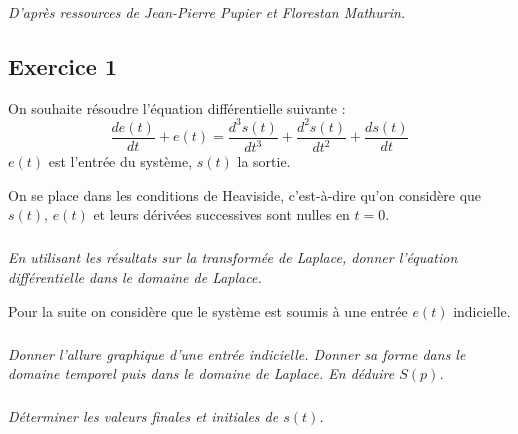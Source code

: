 \documentclass[11pt,oneside]{article}
\begin{document}
\begin{flushright}
\textit{D'après ressources de Jean-Pierre Pupier et Florestan Mathurin.} 
\end{flushright}
\vspace{.5cm}

\subsection*{Exercice 1}
\setcounter{subparagraph}{0}
On souhaite résoudre l'équation différentielle suivante : 
$$
\dfrac{de(t)}{dt}+e(t) = \dfrac{d^3s(t)}{dt^3}+\dfrac{d^2s(t)}{dt^2}+\dfrac{ds(t)}{dt}
$$
$e(t)$ est l'entrée du système, $s(t)$ la sortie.

On se place dans les conditions de Heaviside, c'est-à-dire qu'on considère que $s(t)$, $e(t)$ et leurs dérivées successives sont nulles en $t=0$. 

\subparagraph{}
\textit{En utilisant les résultats sur la transformée de Laplace, donner l'équation différentielle dans le domaine de Laplace.}


Pour la suite on considère que le système est soumis à une entrée $e(t)$ indicielle. 

\subparagraph{}
\textit{Donner l'allure graphique d'une entrée indicielle. Donner sa forme dans le domaine temporel puis dans le domaine de Laplace. En déduire $S(p)$.}



\subparagraph{}
\textit{Déterminer les valeurs finales et initiales de $s(t)$.}
\end{document}
